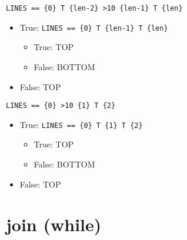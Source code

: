 \documentclass[11pt]{article}
\begin{document}
\begin{itemize}
\verb|LINES == {0} T {len-2} >10 {len-1} T {len}|
\begin{itemize}
\item True: \verb|LINES == {0} T {len-1} T {len}|
\begin{itemize}
\item True: TOP
\item False: BOTTOM
\end{itemize}
\item False: TOP
\end{itemize}

\verb|LINES == {0} >10 {1} T {2}|
\begin{itemize}
\item True: \verb|LINES == {0} T {1} T {2}|
\begin{itemize}
\item True: TOP
\item False: BOTTOM
\end{itemize}
\item False: TOP
\end{itemize}


\end{itemize}

\section{join (while)}
\end{document}
